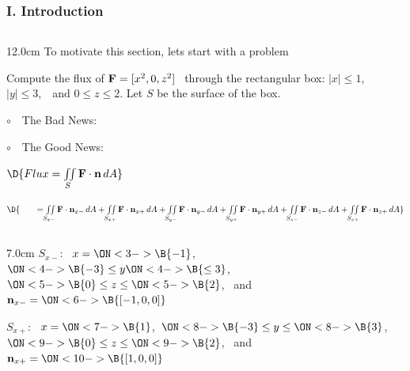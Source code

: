 \begin{frame}
\frametitle{I. Introduction}
\scriptsize
\begin{columns}
\begin{column}{12.0cm}
To motivate this section, lets start with a problem

\vspace{0.2cm}

Compute the flux of ${\bf F} = [x^2,0,z^2]$ \, through the rectangular box: $|x| \le 1$, \,\, $|y| \le 3$, \,\, and $0 \le z \le 2$. \quad Let $S$ be the surface of the box.

\vspace{0.1cm}

\vspace{0.2cm}

$\circ$ \,\, The Bad News: 

\vspace{0.2cm}

$\circ$ \,\, The Good News: 

\vspace{0.2cm}
 
$\D{Flux = \iint \limits_{S} {\bf F} \cdot {\bf n}\, dA}$

$\D{ \qquad = \iint \limits_{S_{x-}} {\bf F} \cdot {\bf n}_{x-}\, dA + \iint \limits_{S_{x+}} {\bf F} \cdot {\bf n}_{x+}\, dA + \iint \limits_{S_{y-}} {\bf F} \cdot {\bf n}_{y-}\, dA + \iint \limits_{S_{y+}} {\bf F} \cdot {\bf n}_{y+}\, dA + \iint \limits_{S_{z-}} {\bf F} \cdot {\bf n}_{z-}\, dA + \iint \limits_{S_{z+}} {\bf F} \cdot {\bf n}_{z+}\, dA}$

\vspace{0.2cm}

\begin{columns}
\begin{column}{7.0cm}
	$S_{x-}$: \, 
	$x=\ON<3->{\B{-1}}$,\, 
	$\ON<4->{\B{-3}} \le y \ON<4->{\B{\le 3}}$,\, 
	$\ON<5->{\B{0}} \le z \le \ON<5->{\B{2}}$, \, and \, ${\bf n}_{x-} = 
	\ON<6->{\B{[-1,0,0]}}$
	
	\vspace{0.3cm}
	
	$S_{x+}$: \, 
	$x=\ON<7->{\B{1}}$,\, 
	$\ON<8->{\B{-3}} \le y \le \ON<8->{\B{3}}$,\, 
	$\ON<9->{\B{0}} \le z \le \ON<9->{\B{2}}$, \, and \, ${\bf n}_{x+} = 
	\ON<10->{\B{[1,0,0]}}$
	

\end{column}
\end{columns}
\end{column}
\end{columns}
\end{frame}
